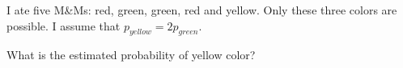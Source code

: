 
\begin{question}
I ate five M\&Ms: red, green, green, red and yellow.
Only these three colors are possible.
I assume that \(p_{yellow}=2 p_{green}\).

What is the estimated probability of yellow color?
\end{question}


